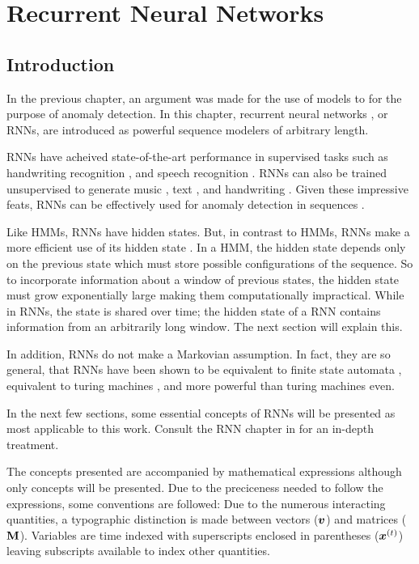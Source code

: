 
\chapter[]{Recurrent Neural Networks}

\section{Introduction}

In the previous chapter, an argument was made for the use of models to for the purpose of anomaly detection. In this chapter, recurrent neural networks \cite{Rumelhart1986}, or RNNs, are introduced as powerful sequence modelers of arbitrary length.

RNNs have acheived state-of-the-art performance in supervised tasks such as handwriting recognition \cite{Graves2009}, and speech recognition  \cite{Graves2013}. RNNs can also be trained unsupervised to generate  music  \cite{Boulanger-Lewandowski2012}, text \cite{Martens2011a,Graves2013b}, and handwriting \cite{Graves2013b}. Given these impressive feats, RNNs can be effectively used for anomaly detection in sequences \cite{Marchi2015,Malhotra2015}.

Like HMMs, RNNs have hidden states. But, in contrast to HMMs, RNNs make a more efficient use of its hidden state \cite{ZacharyC.Lipton2015}. In a HMM, the hidden state depends only on the previous state which must store possible configurations of the sequence. So to incorporate information about a window of previous states, the hidden state must grow exponentially large making them computationally impractical. While in RNNs, the state is shared over time; the hidden state of a RNN contains information from an arbitrarily long window. The next section will explain this.

In addition, RNNs do not make a Markovian assumption. In fact, they are so general, that RNNs have been shown to be equivalent to finite state automata \cite{Minsky1967}, equivalent to turing machines \cite{Siegelmann1995}, and more powerful than turing machines \cite{Siegelmann1993} even.

In the next few sections, some essential concepts of RNNs will be presented as most applicable to this work. Consult the RNN chapter in \cite{Bengio-et-al-2015-Book} for an in-depth treatment.

The concepts presented are accompanied by mathematical expressions although only concepts will be presented. Due to the preciceness needed to follow the expressions, some conventions are followed: Due to the numerous interacting quantities, a typographic distinction is made between vectors ($\boldsymbol{v}$) and  matrices ($\mathbf{M}$). Variables are time indexed with superscripts enclosed in parentheses ($\boldsymbol{x}^{(t)}$) leaving subscripts available to index other quantities.

